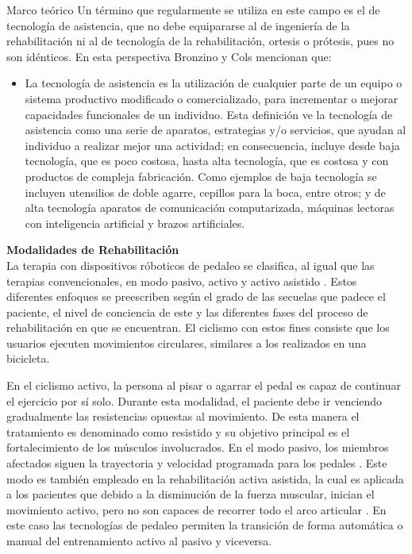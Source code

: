 \begin{thesischapter}{1} {Marco teórico}
    \vspace{10pt}
    Un término que regularmente se utiliza en este campo es el de tecnología de asistencia, que no debe equipararse al de ingeniería de la rehabilitación ni al de tecnología de la rehabilitación, ortesis o prótesis, pues no son idénticos. En esta perspectiva Bronzino y Cols \cite{enderle2012introduction} mencionan que:

    \begin{itemize}
        \item La tecnología de asistencia es la utilización de cualquier parte de un equipo o sistema productivo modificado o comercializado, para incrementar o mejorar capacidades funcionales de un individuo. Esta definición ve la tecnología de asistencia como una serie de aparatos, estrategias y/o servicios, que ayudan al individuo a realizar mejor una actividad; en consecuencia, incluye desde baja tecnología, que es poco costosa, hasta alta tecnología, que es costosa y con productos de compleja fabricación. Como ejemplos de baja tecnología se incluyen utensilios de doble agarre, cepillos para la boca, entre otros; y de alta tecnología aparatos de comunicación computarizada, máquinas lectoras con inteligencia artificial y brazos artificiales.
    \end{itemize}
    
    \vspace{10pt}
    \textbf{Modalidades de Rehabilitación} \\ 
    La terapia con dispositivos róboticos de pedaleo se clasifica, al igual que las terapias convencionales, en modo pasivo, activo y activo asistido \cite{barclay2019effect}. Estos diferentes enfoques se preescriben según el grado de las secuelas que padece el paciente, el nivel de conciencia de este y las diferentes fases del proceso de rehabilitación en que se encuentran. El ciclismo con estos fines consiste que los usuarios ejecuten movimientos circulares, similares a los realizados en una bicicleta.

    \vspace{5pt}
    En el ciclismo activo, la persona al pisar o agarrar el pedal es capaz de continuar el ejercicio por sí solo. Durante esta modalidad, el paciente debe ir venciendo gradualmente las resistencias opuestas al movimiento. De esta manera el tratamiento es denominado como resistido y su objetivo principal es el fortalecimiento de los músculos involucrados. En el modo pasivo, los miembros afectados siguen la trayectoria y velocidad programada para los pedales \cite{ferreira2020virtual}. Este modo es también empleado en la rehabilitación activa asistida, la cual es aplicada a los pacientes que debido a la disminución de la fuerza muscular, inician el movimiento activo, pero no son capaces de recorrer todo el arco articular \cite{cruz2009guia}. En este caso las tecnologías de pedaleo permiten la transición de forma automática o manual del entrenamiento activo al pasivo y viceversa.


\end{thesischapter}
